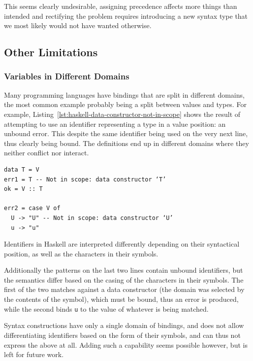 \documentclass{kththesis}
\begin{document}
This seems clearly undesirable, assigning precedence affects more things than intended and rectifying the problem requires introducing a new syntax type that we most likely would not have wanted otherwise.

\subsection{Other Limitations}

\subsubsection{Variables in Different Domains}


Many programming languages have bindings that are split in different domains, the most common example probably being a split between values and types. For example, Listing~\ref{lst:haskell-data-constructor-not-in-scope} shows the result of attempting to use an identifier representing a type in a value position: an unbound error. This despite the same identifier being used on the very next line, thus clearly being bound. The definitions end up in different domains where they neither conflict nor interact.

\begin{listing}[t]
\begin{verbatim}
data T = V
err1 = T -- Not in scope: data constructor ‘T’
ok = V :: T

err2 = case V of
  U -> "U" -- Not in scope: data constructor ‘U’
  u -> "u"
\end{verbatim}
\caption{Identifiers in Haskell are interpreted differently depending on their syntactical position, as well as the characters in their symbols.}
\label{lst:haskell-data-constructor-not-in-scope}
\end{listing}

Additionally the patterns on the last two lines contain unbound identifiers, but the semantics differ based on the casing of the characters in their symbols. The first of the two matches against a data constructor (the domain was selected by the contents of the symbol), which must be bound, thus an error is produced, while the second binds \texttt{u} to the value of whatever is being matched.

Syntax constructions have only a single domain of bindings, and does not allow differentiating identifiers based on the form of their symbols, and can thus not express the above at all. Adding such a capability seems possible however, but is left for future work.
\end{document}
